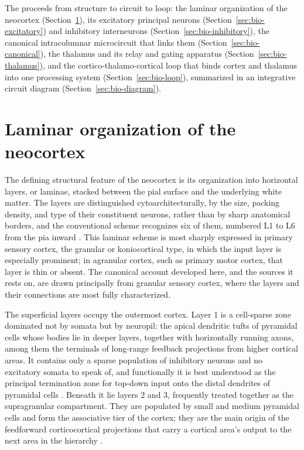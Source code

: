 The \unitname{} proceeds from structure to circuit to loop: the laminar organization of the neocortex (Section~\ref{sec:bio-laminar}), 
its excitatory principal neurons (Section~\ref{sec:bio-excitatory}) and inhibitory interneurons (Section~\ref{sec:bio-inhibitory}), 
the canonical intracolumnar microcircuit that links them (Section~\ref{sec:bio-canonical}), the thalamus and its relay and gating 
apparatus (Section~\ref{sec:bio-thalamus}), and the cortico-thalamo-cortical loop that binds cortex and thalamus into one processing 
system (Section~\ref{sec:bio-loop}), summarized in an integrative circuit diagram (Section~\ref{sec:bio-diagram}).

\section{Laminar organization of the neocortex}
\label{sec:bio-laminar}

The defining structural feature of the neocortex is its organization into horizontal layers, or laminae, stacked between the pial surface 
and the underlying white matter. The layers are distinguished cytoarchitecturally, by the size, packing density, and type of their 
constituent neurons, rather than by sharp anatomical borders, and the conventional scheme recognizes six of them, numbered L1 to L6 from 
the pia inward \parencite{white1989, shepherd2018}. This laminar scheme is most sharply expressed in primary sensory cortex, the 
granular or koniocortical type, in which the input layer is especially prominent; in agranular cortex, such as primary motor cortex, 
that layer is thin or absent. The canonical account developed here, and the sources it rests on, are drawn principally from granular 
sensory cortex, where the layers and their connections are most fully characterized.

The superficial layers occupy the outermost cortex. Layer 1 is a cell-sparse zone dominated not by somata but by neuropil: the apical 
dendritic tufts of pyramidal cells whose bodies lie in deeper layers, together with horizontally running axons, among them the terminals
 of long-range feedback projections from higher cortical areas. It contains only a sparse population of inhibitory neurons and no 
 excitatory somata to speak of, and functionally it is best understood as the principal termination zone for top-down input onto the 
 distal dendrites of pyramidal cells \parencite{shepherd2018}. Beneath it lie layers 2 and 3, frequently treated together as the supragranular compartment. They are populated by small and medium pyramidal cells and form the associative tier of the cortex; they are the 
 main origin of the feedforward corticocortical projections that carry a cortical area's output to the next area in the hierarchy 
 \parencite{douglas2004}.

